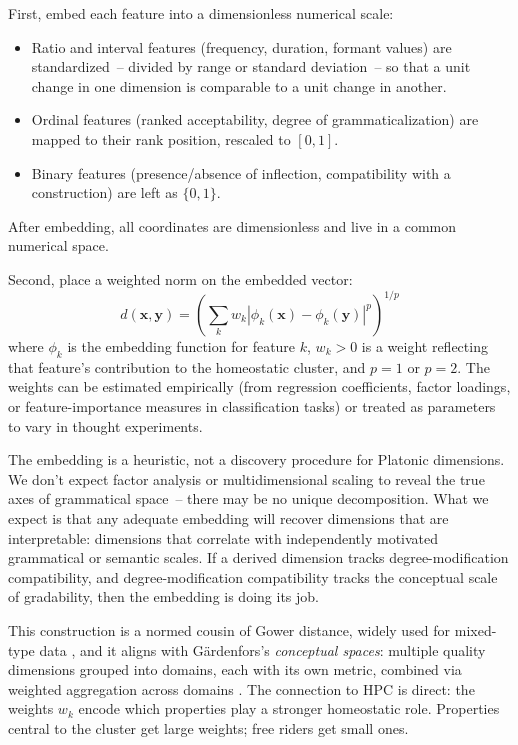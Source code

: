 First, embed each feature into a dimensionless numerical scale:
\begin{itemize}
\item Ratio and interval features (frequency, duration, formant values) are standardized~-- divided by range or standard deviation~-- so that a unit change in one dimension is comparable to a unit change in another.
\item Ordinal features (ranked acceptability, degree of grammaticalization) are mapped to their rank position, rescaled to $[0,1]$.
\item Binary features (presence/absence of inflection, compatibility with a construction) are left as $\{0,1\}$.
\end{itemize}

After embedding, all coordinates are dimensionless and live in a common numerical space.

Second, place a weighted norm on the embedded vector:
\[
d(\mathbf{x}, \mathbf{y}) = \left( \sum_k w_k \left| \phi_k(\mathbf{x}) - \phi_k(\mathbf{y}) \right|^p \right)^{1/p}
\]
where $\phi_k$ is the embedding function for feature $k$, $w_k > 0$ is a weight reflecting that feature's contribution to the homeostatic cluster, and $p = 1$ or $p = 2$. The weights can be estimated empirically (from regression coefficients, factor loadings, or feature-importance measures in classification tasks) or treated as parameters to vary in thought experiments.

The embedding is a heuristic, not a discovery procedure for Platonic dimensions. We don't expect factor analysis or multidimensional scaling to reveal the true axes of grammatical space~-- there may be no unique decomposition. What we expect is that any adequate embedding will recover dimensions that are interpretable: dimensions that correlate with independently motivated grammatical or semantic scales. If a derived dimension tracks degree-modification compatibility, and degree-modification compatibility tracks the conceptual scale of gradability, then the embedding is doing its job.

This construction is a normed cousin of Gower distance, widely used for mixed-type data \citep{gower1971}, and it aligns with Gärdenfors's \emph{conceptual spaces}: multiple quality dimensions grouped into domains, each with its own metric, combined via weighted aggregation across domains \citep{gardenfors2000}. The connection to HPC is direct: the weights $w_k$ encode which properties play a stronger homeostatic role. Properties central to the cluster get large weights; free riders get small ones.

